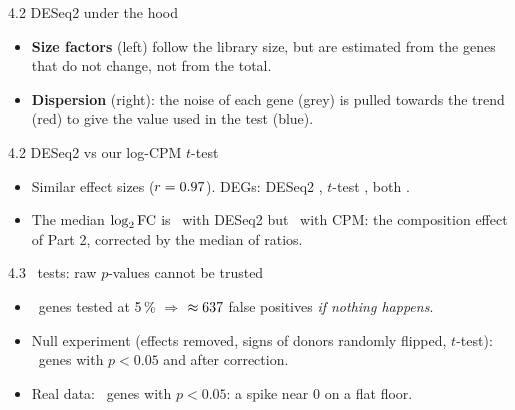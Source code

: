 \begin{frame}{4.2 DESeq2 under the hood}
  \centering
  \begin{itemize}\small\setlength\itemsep{2pt}
    \item \textbf{Size factors} (left) follow the library size, but are estimated from the genes that do not change, not from the total.
    \item \textbf{Dispersion} (right): the noise of each gene (grey) is \alert{pulled towards the trend} (red) to give the value used in the test (blue).
  \end{itemize}
\end{frame}

\begin{frame}{4.2 DESeq2 vs our log-CPM $t$-test}
  \centering
  \begin{itemize}\small\setlength\itemsep{2pt}
    \item Similar effect sizes ($r=0.97$). DEGs: DESeq2 \numndegdeseq, $t$-test \numndegt, \alert{both \numndegboth}.
    \item The median $\log_2\mathrm{FC}$ is \nummediandeseq\ with DESeq2 but \nummediancpm\ with CPM: the \alert{composition effect} of Part 2, corrected by the median of ratios.
  \end{itemize}
\end{frame}

\begin{frame}{4.3 \numntested\ tests: raw $p$-values cannot be trusted}
  \centering
  \begin{itemize}\small\setlength\itemsep{2pt}
    \item \numntested\ genes tested at 5\,\% $\Rightarrow$ $\approx637$ false positives \emph{if nothing happens}.
    \item Null experiment (effects removed, signs of donors randomly flipped, $t$-test): \numnnullraw\ genes with $p<0.05$ and \alert{\numnnulladj} after correction.
    \item Real data: \numnrawsig\ genes with $p<0.05$: a spike near 0 on a flat floor.
  \end{itemize}
\end{frame}

